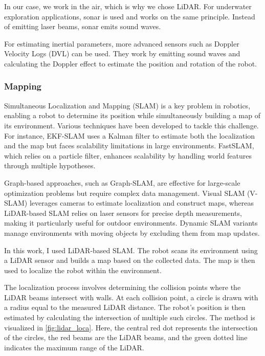 \documentclass[../main.tex]{subfiles}
\begin{document}
In our case, we work in the air, which is why we chose LiDAR. For underwater exploration applications, sonar is used and works on the same principle. Instead of emitting laser beams, sonar emits sound waves. 

\vspace{0.5em}

For estimating inertial parameters, more advanced sensors such as Doppler Velocity Logs (DVL) can be used. They work by emitting sound waves and calculating the Doppler effect to estimate the position and rotation of the robot.


\subsubsection{Mapping}

Simultaneous Localization and Mapping (SLAM) is a key problem in robotics, enabling a robot to determine its position while simultaneously building a map of its environment. Various techniques have been developed to tackle this challenge. For instance, EKF-SLAM uses a Kalman filter to estimate both the localization and the map but faces scalability limitations in large environments. FastSLAM, which relies on a particle filter, enhances scalability by handling world features through multiple hypotheses.  

\vspace{1em}

Graph-based approaches, such as Graph-SLAM, are effective for large-scale optimization problems but require complex data management. Visual SLAM (V-SLAM) leverages cameras to estimate localization and construct maps, whereas LiDAR-based SLAM relies on laser sensors for precise depth measurements, making it particularly useful for outdoor environments. Dynamic SLAM variants manage environments with moving objects by excluding them from map updates.\cite{ding_2024}

\vspace{1em}

In this work, I used LiDAR-based SLAM. The robot scans its environment using a LiDAR sensor and builds a map based on the collected data. The map is then used to localize the robot within the environment.

\vspace{1em}

The localization process involves determining the collision points where the LiDAR beams intersect with walls. At each collision point, a circle is drawn with a radius equal to the measured LiDAR distance. The robot's position is then estimated by calculating the intersection of multiple such circles. 
The method is visualized in \autoref{fig:lidar_loca}. Here, the central red dot represents the intersection of the circles, the red beams are the LiDAR beams, and the green dotted line indicates the maximum range of the LiDAR.
\end{document}
